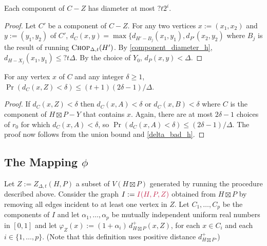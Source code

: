 \documentclass{patmorin}
\makeatletter
\renewcommand{\ge}{\geqslant}
\renewcommand{\le}{\leqslant}
\def\mathcolor#1#{\@mathcolor{#1}}
\def\@mathcolor#1#2#3{%
  \protect\leavevmode
  \begingroup
    \color#1{#2}#3%
  \endgroup
}
\newcommand{\mathdefin}[1]{\mathcolor{brightmaroon}{#1}}
\makeatother
\begin{document}
\begin{lem}\label{component_diameter}
  Each component of $C-Z$ has diameter at most $?t2^i$.
\end{lem}

\begin{proof}
  Let $C'$ be a component of $C-Z$.  For any two vertices $x:=(x_1,x_2)$ and $y:=(y_1,y_2)$ of $C'$, $d_{C}(x,y) = \max\{d_{H'-B_j}(x_1,y_1),d_{P'}(x_2,y_2)$ where $B_j$ is the result of running $\textsc{Chop}_{\Delta,t}(H')$. By \cref{component_diameter_h},  $d_{H-X_j}(x_1,y_1)\le ?t\Delta$.  By the choice of $Y_0$, $d_{P}(x,y)<\Delta$.
\end{proof}



\begin{lem}\label{delta_bad_product}
  For any vertex $x$ of $C$ and any integer $\delta\ge 1$, $\Pr(d_{C}(x,Z)< \delta)\le (t+1)(2\delta-1)/\Delta$.
\end{lem}

\begin{proof}
  If $d_{C}(x,Z)<\delta$ then $d_{C}(x,A)<\delta$ or $d_{C}(x,B)<\delta$ where $C$ is the component of $H\boxtimes P-Y$ that contains $x$.  Again, there are at most $2\delta-1$ choices of $r_0$ for which $d_{C}(x,A)<\delta$, so $\Pr(d_{C}(x,A)<\delta)\le (2\delta-1)/\Delta$.  The proof now follows from the union bound and \cref{delta_bad_h}.
\end{proof}

%
%

\subsection{\boldmath The Mapping $\phi$}

Let $Z:=Z_{\Delta,t}(H,P)$ a subset of $V(H\boxtimes P)$ generated by running the procedure described above.  Consider the graph $I:=\mathdefin{I(H,P,Z)}$ obtained from $H\boxtimes P$ by removing all edges incident to at least one vertex in $Z$. Let $C_1,\ldots,C_p$ be the components of $I$ and let $\alpha_1,\ldots,\alpha_p$ be mutually independent uniform real numbers in $[0,1]$ and let $\varphi_Z(x):=(1+\alpha_i)\,d^+_{H\boxtimes P}(x,Z)$, for each $x\in C_i$ and each $i\in\{1,\ldots,p\}$.  (Note that this definition uses positive distance $d^+_{H\boxtimes P}$.)
\end{document}
